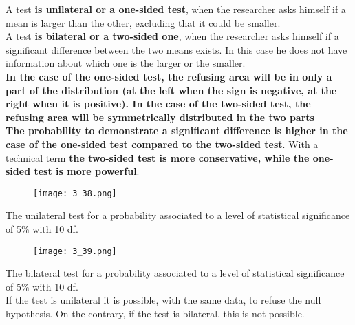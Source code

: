 \begin{frame}
  \begin{small}
    \vspace*{.25cm}
    A test \textbf{is unilateral or a one-sided test}, when the researcher asks himself if a mean is larger than the other, excluding that it could be smaller.\\
    \vspace*{.25cm}
    A test \textbf{is bilateral or a two-sided one}, when the researcher asks himself if a significant difference between the two means exists. In this case he does not have information about which one is the larger or the smaller. \\
    \vspace*{.25cm}
    \textbf{In the case of the one-sided test, the refusing area will be in only a part of the distribution (at the left when the sign is negative, at the right when it is positive). In the case of the two-sided test, the refusing area will be symmetrically distributed in the two parts}\\
    \textbf{The probability to demonstrate a significant difference is higher in the case of the one-sided test compared to the two-sided test}. With a technical term \textbf{the two-sided test is more conservative, while the one-sided test is more powerful}.
  \end{small}
\end{frame}

\begin{frame}
  \vspace*{.5cm}
  \begin{figure}
    \texttt{[image: 3\_38.png]}
  \end{figure}
  The unilateral test for a probability associated to a level of statistical significance of 5$ \% $ with 10 df.
\end{frame}

\begin{frame}
  \begin{figure}
    \texttt{[image: 3\_39.png]}
  \end{figure}
  The bilateral test for a probability associated to a level of statistical significance of 5$ \% $ with 10 df.\\
  \vspace*{.25cm}
  If the test is unilateral it is possible, with the same data, to refuse the null hypothesis. On the contrary, if the test is bilateral, this is not possible.
\end{frame}

